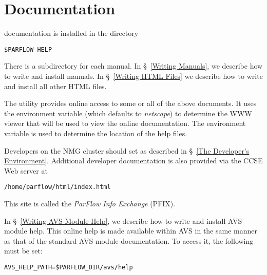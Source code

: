 
\chapter{Documentation}
\label{Documentation}

\parflow{} documentation is installed in the directory
\begin{display}\begin{verbatim}
$PARFLOW_HELP
\end{verbatim}\end{display}
There is a subdirectory for each manual.
In \S~\ref{Writing Manuals}, we describe how to write and install
\parflow{} manuals.
In \S~\ref{Writing HTML Files} we describe how to write and install
all other HTML files.

The utility  provides online access to some or all
of the above documents.
It  uses the environment variable  (which
defaults to {\em netscape}) to determine the WWW viewer that
will be used to view the online documentation.  
The environment variable
 is used to determine the location of the
help files.

Developers on the NMG cluster should set 
as described in \S~\ref{The Developer's Environment}.
Additional developer documentation is also provided via the CCSE Web server at
\begin{display}\begin{verbatim}
/home/parflow/html/index.html
\end{verbatim}\end{display}
This site is called the {\em ParFlow Info Exchange} (PFIX).


In \S~\ref{Writing AVS Module Help}, we describe how to write and
install \parflow{} AVS module help.
This online help is made available within AVS in the same manner as
that of the standard AVS module documentation.
To access it, the following must be set:
\begin{display}\begin{verbatim}
AVS_HELP_PATH=$PARFLOW_DIR/avs/help
\end{verbatim}\end{display}


